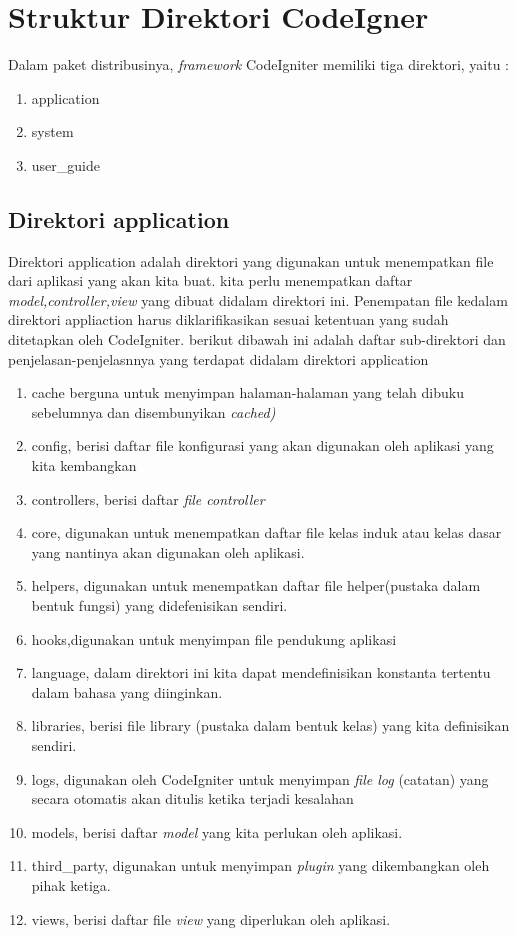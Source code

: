 \section{Struktur Direktori CodeIgner}
Dalam paket distribusinya, \textit{framework} CodeIgniter memiliki tiga direktori, yaitu :
\begin{enumerate}
\item application
\item system
\item user\_guide
\end{enumerate}

\subsection {Direktori application}
Direktori application adalah direktori yang digunakan untuk menempatkan file dari aplikasi yang akan kita buat. kita perlu menempatkan daftar \textit{model,controller,view} yang dibuat didalam direktori ini.
Penempatan file kedalam direktori appliaction harus diklarifikasikan sesuai ketentuan yang sudah ditetapkan oleh CodeIgniter. berikut dibawah ini adalah daftar sub-direktori dan penjelasan-penjelasnnya yang terdapat didalam direktori application
\begin{enumerate}
\item cache berguna untuk menyimpan halaman-halaman yang telah dibuku sebelumnya dan disembunyikan \textit{cached)}
\item config, berisi daftar file konfigurasi yang akan digunakan oleh aplikasi yang kita kembangkan
\item controllers, berisi daftar \textit{file controller}
\item core, digunakan untuk menempatkan daftar file kelas induk atau kelas dasar yang nantinya akan digunakan oleh aplikasi.
\item helpers, digunakan untuk menempatkan daftar file helper(pustaka dalam bentuk fungsi) yang didefenisikan sendiri.
\item hooks,digunakan untuk menyimpan file pendukung aplikasi
\item language, dalam direktori ini kita dapat mendefinisikan konstanta tertentu dalam bahasa yang diinginkan.
\item libraries, berisi file library (pustaka dalam bentuk kelas) yang kita definisikan sendiri.
\item logs, digunakan oleh CodeIgniter untuk menyimpan \textit{file log} (catatan) yang secara otomatis akan ditulis ketika terjadi kesalahan
\item models, berisi daftar \textit{model} yang kita perlukan oleh aplikasi.
\item third\_party, digunakan untuk menyimpan \textit{plugin} yang dikembangkan oleh pihak ketiga.
\item views, berisi daftar file \textit{view} yang diperlukan oleh aplikasi.
\end{enumerate}

